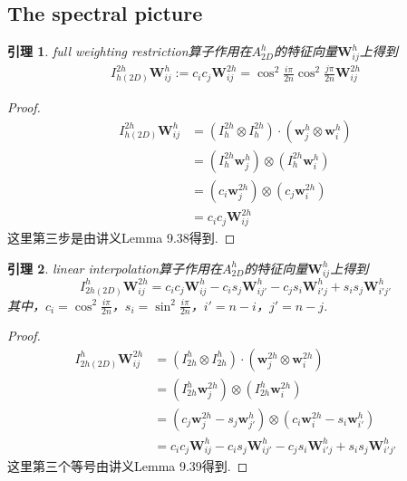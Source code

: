 \documentclass[a4paper,11.5pt,UTF8]{ctexart}
\newtheorem{lemma}{引理}[section]
\begin{document}
\begin{large}
\section{The spectral picture}
\begin{lemma}
	full weighting restriction算子作用在$A_{2D}^{h}$的特征向量$\mathbf{W}_{ij}^{h}$上得到
	\begin{align*}
		I^{2h}_{h(2D)}\mathbf{W}_{ij}^{h} := c_ic_j\mathbf{W}_{ij}^{2h} = \cos^2\frac{i\pi}{2n}\cos^2\frac{j\pi}{2n}\mathbf{W}_{ij}^{2h}
	\end{align*}
\end{lemma}
\begin{proof}
	\begin{align*}
		I^{2h}_{h(2D)}\mathbf{W}_{ij}^{h} &= (I^{2h}_h\otimes I^{2h}_h)\cdot(\mathbf{w}_j^h\otimes\mathbf{w}_i^h) \\
		&= (I^{2h}_{h}\mathbf{w}_{j}^{h})\otimes(I^{2h}_{h}\mathbf{w}_{i}^{h}) \\
		&= (c_i\mathbf{w}_{j}^{2h})\otimes(c_j\mathbf{w}_{i}^{2h}) \\
		&= c_ic_j\mathbf{W}_{ij}^{2h}
	\end{align*}
	这里第三步是由讲义Lemma 9.38得到.
\end{proof}

\begin{lemma}
	linear interpolation算子作用在$A_{2D}^{h}$的特征向量$\mathbf{W}_{ij}^{h}$上得到
	$$I^h_{2h(2D)}\mathbf{W}_{ij}^{2h} = c_ic_j\mathbf{W}_{ij}^h-c_is_j\mathbf{W}_{ij'}^h-c_js_i\mathbf{W}_{i'j}^h+s_is_j\mathbf{W}_{i'j'}^h$$
	其中，$c_i = \cos^2\frac{i\pi}{2n}$，$s_i=\sin^2\frac{i\pi}{2n}$，$i'=n-i$，$j'=n-j$.
\end{lemma}
\begin{proof}
	\begin{align*}
		I^h_{2h(2D)}\mathbf{W}_{ij}^{2h} &= (I^h_{2h}\otimes I^h_{2h})\cdot(\mathbf{w}_{j}^{2h}\otimes\mathbf{w}_{i}^{2h}) \\
		&= (I^h_{2h}\mathbf{w}_{j}^{2h})\otimes(I^h_{2h}\mathbf{w}_{i}^{2h}) \\
		&= (c_j\mathbf{w}_{j}^{2h}-s_j\mathbf{w}_{j'}^h)\otimes(c_i\mathbf{w}_{i}^{2h}-s_i\mathbf{w}_{i'}^h) \\
		&= c_ic_j\mathbf{W}_{ij}^h-c_is_j\mathbf{W}_{ij'}^h-c_js_i\mathbf{W}_{i'j}^h+s_is_j\mathbf{W}_{i'j'}^h
	\end{align*}
	这里第三个等号由讲义Lemma 9.39得到.
\end{proof}


\end{large}
\end{document}
